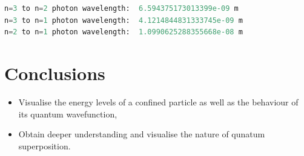 \begin{lstlisting}[language=Python]
n=3 to n=2 photon wavelength:  6.594375173013399e-09 m
n=3 to n=1 photon wavelength:  4.1214844831333745e-09 m
n=2 to n=1 photon wavelength:  1.0990625288355668e-08 m
\end{lstlisting}

\section{Conclusions}

\begin{itemize}
    \item Visualise the energy levels of a confined particle as well as the behaviour of its quantum wavefunction,
    \item Obtain deeper understanding and visualise the nature of qunatum superposition.
\end{itemize}